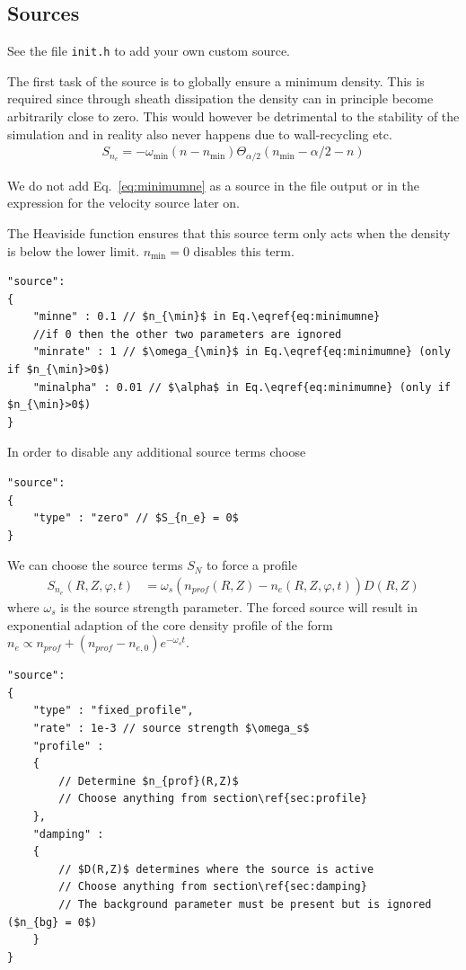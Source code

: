 \subsection{Sources} \label{sec:sources}
See the file {\tt init.h} to add your own custom source.

The first task of the source is to globally ensure a minimum density. This
is required since through sheath dissipation the density can in
principle become arbitrarily close to zero. This would however
be detrimental to the stability of the simulation and in reality
also never happens due to wall-recycling etc.
\begin{align}
    S_{n_e} = -\omega_{\min} ( n - n_{\min}) \Theta_{\alpha/2}( n_{\min}-\alpha/2 -n)
    \label{eq:minimumne}
\end{align}
\begin{tcolorbox}[title=Note]
    We do not add Eq.~\eqref{eq:minimumne} as a source in the file output or in
    the expression for the velocity source later on.
\end{tcolorbox}
The Heaviside function ensures that this source term only acts when the density
is below the lower limit. $n_{\min}=0$ disables this term.
\begin{verbatim}
"source":
{
    "minne" : 0.1 // $n_{\min}$ in Eq.\eqref{eq:minimumne}
    //if 0 then the other two parameters are ignored
    "minrate" : 1 // $\omega_{\min}$ in Eq.\eqref{eq:minimumne} (only if $n_{\min}>0$)
    "minalpha" : 0.01 // $\alpha$ in Eq.\eqref{eq:minimumne} (only if $n_{\min}>0$)
}
\end{verbatim}
\noindent
In order to disable any additional source terms choose
\begin{verbatim}
"source":
{
    "type" : "zero" // $S_{n_e} = 0$
}
\end{verbatim}
\noindent We can choose the source terms $S_N$ to force a profile
\begin{align} \label{eq:electron_source}
    S_{n_e}(R,Z,\varphi, t) &= \omega_s (n_{prof}(R,Z) - n_e(R,Z,\varphi, t))D(R,Z)
\end{align}
where $\omega_s$ is the source strength parameter.
The forced source will result in exponential adaption of the core
density profile of the form $n_e \propto n_{prof}+(n_{prof}-n_{e,0})e^{-\omega_st}$.
\begin{verbatim}
"source":
{
    "type" : "fixed_profile",
    "rate" : 1e-3 // source strength $\omega_s$
    "profile" :
    {
        // Determine $n_{prof}(R,Z)$
        // Choose anything from section\ref{sec:profile}
    },
    "damping" :
    {
        // $D(R,Z)$ determines where the source is active
        // Choose anything from section\ref{sec:damping}
        // The background parameter must be present but is ignored ($n_{bg} = 0$)
    }
}
\end{verbatim}

